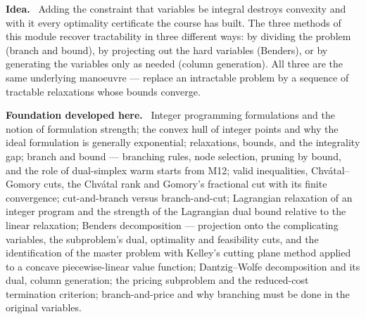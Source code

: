 \documentclass[11pt,a4paper]{article}
\newcommand{\mpart}[1]{\smallskip\noindent\textbf{#1}\ \ignorespaces}
\begin{document}
\mpart{Idea.} Adding the constraint that variables be integral destroys convexity and with it
every optimality certificate the course has built. The three methods of this module recover
tractability in three different ways: by dividing the problem (branch and bound), by projecting
out the hard variables (Benders), or by generating the variables only as needed (column
generation). All three are the same underlying manoeuvre --- replace an intractable problem by
a sequence of tractable relaxations whose bounds converge.

\mpart{Foundation developed here.} Integer programming formulations and the notion of formulation
strength; the convex hull of integer points and why the ideal formulation is generally
exponential; relaxations, bounds, and the integrality gap; branch and bound --- branching rules,
node selection, pruning by bound, and the role of dual-simplex warm starts from M12; valid
inequalities, Chv\'atal--Gomory cuts, the Chv\'atal rank and Gomory's fractional cut with its
finite convergence; cut-and-branch versus branch-and-cut; Lagrangian relaxation of an integer
program and the strength of the Lagrangian dual bound relative to the linear relaxation;
Benders decomposition --- projection onto the complicating variables, the subproblem's dual,
optimality and feasibility cuts, and the identification of the master problem with Kelley's
cutting plane method applied to a concave piecewise-linear value function; Dantzig--Wolfe
decomposition and its dual, column generation; the pricing subproblem and the reduced-cost
termination criterion; branch-and-price and why branching must be done in the original
variables.
\end{document}
